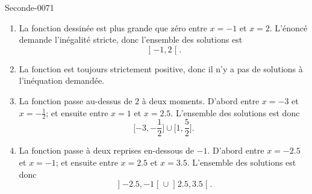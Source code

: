
\begin{corrige}{Seconde-0071}

    \begin{enumerate}
        \item
            La fonction dessinée est plus grande que zéro entre \( x=-1\) et \( x=2\). L'énoncé demande l'inégalité stricte, donc l'ensemble des solutions est
            \begin{equation}
                \mathopen] -1 , 2 \mathclose[.
            \end{equation}
        \item
            La fonction est toujours strictement positive, donc il n'y a pas de solutions à l'inéquation demandée.
        \item
            La fonction passe au-dessus de \( 2\) à deux moments. D'abord entre \( x=-3\) et \( x=-\frac{ 1 }{2}\); et ensuite entre \( x=1\) et \( x=2.5\). L'ensemble des solutions est donc
            \begin{equation}
                \mathopen[ -3 , -\frac{ 1 }{2} \mathclose]\cup\mathopen[ 1 , \frac{ 5 }{2} \mathclose].
            \end{equation}
        \item
            La fonction passe à deux reprises en-dessous de \( -1\). D'abord entre \( x=-2.5\) et \( x=-1\); et ensuite entre \( x=2.5\) et \( x=3.5\). L'ensemble des solutions est donc
            \begin{equation}
                \mathopen] -2.5 , -1 \mathclose[\cup\mathopen] 2.5 , 3.5 \mathclose[.
            \end{equation}
    \end{enumerate}

\end{corrige}
